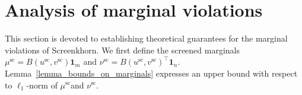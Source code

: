 
\section{Analysis of marginal violations} %
\label{sec:analysis_of_marginal_violations}

This section is devoted to establishing theoretical guarantees for the marginal violations of Screenkhorn. 
We first define the screened marginals $\mu^{\text{sc}} = B(u^{\text{sc}}, v^{\text{sc}}) \mathbf 1_m$ and $\nu^{\text{sc}} = B(u^{\text{sc}}, v^{\text{sc}})^\top \mathbf 1_n.$ 
Lemma~\ref{lemma_bounds_on_marginals} expresses an upper bound with respect to $\ell_1$-norm of $\mu^{\text{sc}}$and $\nu^{\text{sc}}$. %

